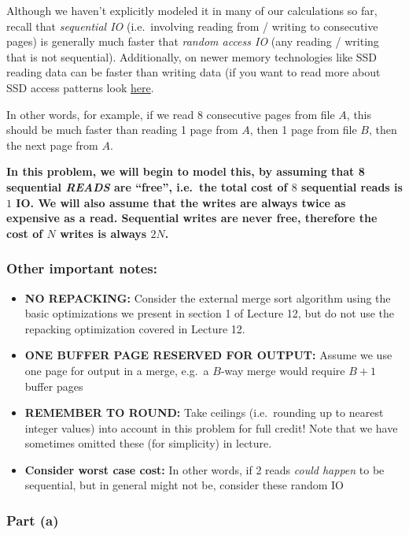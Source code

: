 \documentclass[11pt]{article}
\providecommand{\tightlist}{%
      \setlength{\itemsep}{0pt}\setlength{\parskip}{0pt}}
\begin{document}
Although we haven't explicitly modeled it in many of our calculations so
far, recall that \emph{sequential IO} (i.e.~involving reading from /
writing to consecutive pages) is generally much faster that \emph{random
access IO} (any reading / writing that is not sequential). Additionally,
on newer memory technologies like SSD reading data can be faster than
writing data (if you want to read more about SSD access patterns look
\href{http://codecapsule.com/2014/02/12/coding-for-ssds-part-5-access-patterns-and-system-optimizations/}{here}.

In other words, for example, if we read 8 consecutive pages from file
\(A\), this should be much faster than reading 1 page from \(A\), then 1
page from file \(B\), then the next page from \(A\).

\textbf{In this problem, we will begin to model this, by assuming that 8
sequential \emph{READS} are ``free'', i.e.~the total cost of \(8\)
sequential reads is \(1\) IO. We will also assume that the writes are
always twice as expensive as a read. Sequential writes are never free,
therefore the cost of \(N\) writes is always \(2N\).}

\hypertarget{other-important-notes}{%
\subsubsection{Other important notes:}\label{other-important-notes}}

\begin{itemize}
\tightlist
\item
  \textbf{NO REPACKING:} Consider the external merge sort algorithm
  using the basic optimizations we present in section 1 of Lecture 12,
  but do not use the repacking optimization covered in Lecture 12.
\item
  \textbf{ONE BUFFER PAGE RESERVED FOR OUTPUT:} Assume we use one page
  for output in a merge, e.g.~a \(B\)-way merge would require \(B+1\)
  buffer pages
\item
  \textbf{REMEMBER TO ROUND:} Take ceilings (i.e.~rounding up to nearest
  integer values) into account in this problem for full credit! Note
  that we have sometimes omitted these (for simplicity) in lecture.
\item
  \textbf{Consider worst case cost:} In other words, if 2 reads
  \emph{could happen} to be sequential, but in general might not be,
  consider these random IO
\end{itemize}

    \hypertarget{part-a}{%
\subsubsection{Part (a)}\label{part-a}}
\end{document}
